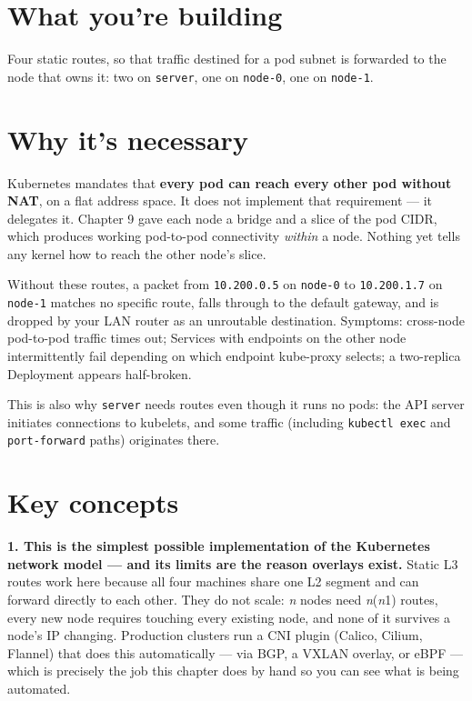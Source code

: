 \documentclass[11pt,oneside]{report}
\begin{document}
\hypertarget{what-youre-building-11}{%
\section{What you're
building}\label{what-youre-building-11}}

Four static routes,
so that traffic
destined for a pod
subnet is forwarded
to the node that
owns it: two on
\texttt{server}, one
on \texttt{node-0},
one on
\texttt{node-1}.

\hypertarget{why-its-necessary-11}{%
\section{Why it's
necessary}\label{why-its-necessary-11}}

\begin{whybox}

Kubernetes mandates
that \textbf{every
pod can reach every
other pod without
NAT}, on a flat
address space. It
does not implement
that requirement ---
it delegates it.
Chapter 9 gave each
node a bridge and a
slice of the pod
CIDR, which produces
working pod-to-pod
connectivity
\emph{within} a
node. Nothing yet
tells any kernel how
to reach the other
node's slice.

\end{whybox}

Without these
routes, a packet
from
\texttt{10.200.0.5}
on \texttt{node-0}
to
\texttt{10.200.1.7}
on \texttt{node-1}
matches no specific
route, falls through
to the default
gateway, and is
dropped by your LAN
router as an
unroutable
destination.
Symptoms: cross-node
pod-to-pod traffic
times out; Services
with endpoints on
the other node
intermittently fail
depending on which
endpoint kube-proxy
selects; a
two-replica
Deployment appears
half-broken.

This is also why
\texttt{server}
needs routes even
though it runs no
pods: the API server
initiates
connections to
kubelets, and some
traffic (including
\texttt{kubectl\ exec}
and
\texttt{port-forward}
paths) originates
there.

\hypertarget{key-concepts-11}{%
\section{Key
concepts}\label{key-concepts-11}}

\textbf{1. This is
the simplest
possible
implementation of
the Kubernetes
network model ---
and its limits are
the reason overlays
exist.} Static L3
routes work here
because all four
machines share one
L2 segment and can
forward directly to
each other. They do
not scale: \emph{n}
nodes need
\emph{n}(\emph{n}\textminus{}1)
routes, every new
node requires
touching every
existing node, and
none of it survives
a node's IP
changing. Production
clusters run a CNI
plugin (Calico,
Cilium, Flannel)
that does this
automatically ---
via BGP, a VXLAN
overlay, or eBPF ---
which is precisely
the job this chapter
does by hand so you
can see what is
being automated.
\end{document}
